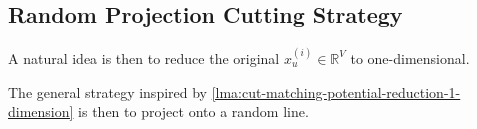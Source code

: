 \subsection{Random Projection Cutting Strategy}
A natural idea is then to reduce the original \(x_u^{(i)} \in \mathbb{R} ^{V}\) to one-dimensional.

\begin{intuition}
	The general strategy inspired by \autoref{lma:cut-matching-potential-reduction-1-dimension} is then to project onto a random line.
\end{intuition}